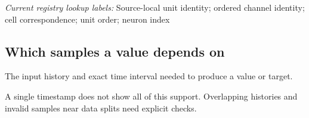 \noindent\textit{Current registry lookup labels:} Source-local unit identity; ordered channel identity; cell correspondence; unit order; neuron index\par

\begin{samepage}
\subsection*{Which samples a value depends on}
\noindent The input history and exact time interval needed to produce a value or target.\par
\end{samepage}
\begin{samepage}
\noindent A single timestamp does not show all of this support. Overlapping histories and invalid samples near data splits need explicit checks.\par\nopagebreak[4]

\end{samepage}

